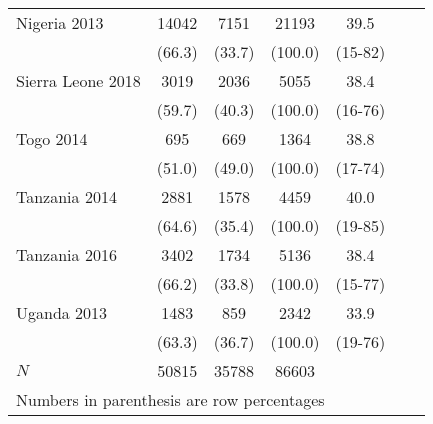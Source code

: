\begin{tabular}{l*{6}{c}}
Nigeria 2013&                  {14042}&                {7151}&           {21193}&              {39.5}\\
&                                              {(66.3)}&      {(33.7)}&             {(100.0)}&            {(15-82)}\\
Sierra Leone 2018&             {3019}&                {2036}&           {5055}&              {38.4}\\
&                                              {(59.7)}&      {(40.3)}&             {(100.0)}&            {(16-76)}\\
Togo 2014&                             {695}&               {669}&           {1364}&              {38.8}\\
&                                              {(51.0)}&     {(49.0)}&             {(100.0)}&            {(17-74)}\\
Tanzania 2014&                 {2881}&               {1578}&           {4459}&              {40.0}\\
&                                              {(64.6)}&     {(35.4)}&             {(100.0)}&            {(19-85)}\\
Tanzania 2016&                 {3402}&               {1734}&           {5136}&              {38.4}\\
&                                              {(66.2)}&     {(33.8)}&             {(100.0)}&            {(15-77)}\\
Uganda 2013&                   {1483}&               {859}&           {2342}&              {33.9}\\
&                                              {(63.3)}&     {(36.7)}&             {(100.0)}&            {(19-76)}\\
\hline
\(N\)                          &       {50815}                &  {35788} &    {86603} &            {}\\
\hline\hline
\multicolumn{6}{l}{\footnotesize Numbers in parenthesis are row percentages}\\
\end{tabular}